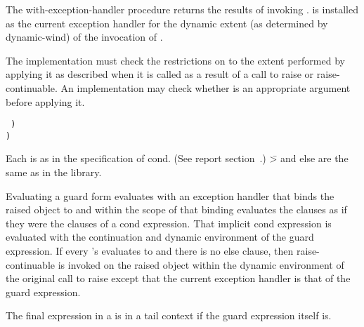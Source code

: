 \begin{entry}{%
}

  The {\cf
with-exception-handler} procedure returns the results of invoking
.   is installed as the current
exception handler for the dynamic extent (as determined by {\cf
  dynamic-wind}) of the invocation of .

\implresp The implementation must check the restrictions on
 to the extent performed by applying it as described
when it is called as a result of a call to {\cf raise} or {\cf
  raise-continuable}.
An
implementation may check whether  is an appropriate argument
before applying it.
\end{entry}

\begin{entry}{%
{\tt\obeyspaces%
\hspace*{3em}  \dotsfoo)\\
\hspace*{2em})}\\
\litprotonoindex{=>}
}
\schindex{=>}

\syntax
Each  is as in the specification of {\cf cond}.
(See report section~.)
{\cf \=>} and {\cf else} are the same as in the  library.

\semantics 
Evaluating a {\cf guard} form evaluates  with an exception
handler that binds the raised object to  and within the scope of
that binding evaluates the clauses as if they were the clauses of a
{\cf cond} expression. That implicit {\cf cond} expression is evaluated with the
continuation and dynamic environment of the {\cf guard} expression. If every
's  evaluates to \schfalse{} and there
is no {\cf else} clause, then
{\cf raise-continuable} is invoked on the raised object within the dynamic
environment of the original call to {\cf raise} except that the current
exception handler is that of the {\cf guard} expression.  

The final expression in a  is in a tail context if
the {\cf guard} expression itself is.
\end{entry}

